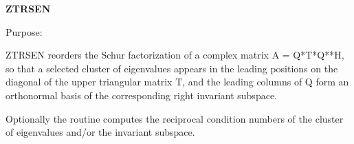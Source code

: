 {\bfseries Z\+T\+R\+S\+E\+N} 

 \begin{DoxyParagraph}{Purpose\+: }
\begin{DoxyVerb} ZTRSEN reorders the Schur factorization of a complex matrix
 A = Q*T*Q**H, so that a selected cluster of eigenvalues appears in
 the leading positions on the diagonal of the upper triangular matrix
 T, and the leading columns of Q form an orthonormal basis of the
 corresponding right invariant subspace.

 Optionally the routine computes the reciprocal condition numbers of
 the cluster of eigenvalues and/or the invariant subspace.\end{DoxyVerb}
 
\end{DoxyParagraph}

